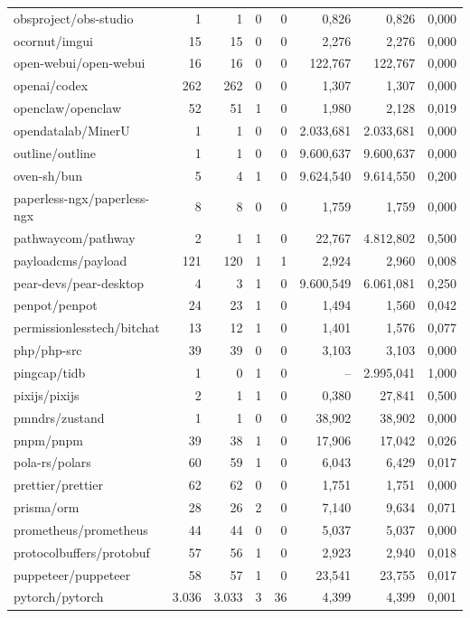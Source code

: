 \begin{tabular}{lrrrrrrr}
obsproject/obs-studio & 1 & 1 & 0 & 0 & 0,826 & 0,826 & 0,000 \\
ocornut/imgui & 15 & 15 & 0 & 0 & 2,276 & 2,276 & 0,000 \\
open-webui/open-webui & 16 & 16 & 0 & 0 & 122,767 & 122,767 & 0,000 \\
openai/codex & 262 & 262 & 0 & 0 & 1,307 & 1,307 & 0,000 \\
openclaw/openclaw & 52 & 51 & 1 & 0 & 1,980 & 2,128 & 0,019 \\
opendatalab/MinerU & 1 & 1 & 0 & 0 & 2.033,681 & 2.033,681 & 0,000 \\
outline/outline & 1 & 1 & 0 & 0 & 9.600,637 & 9.600,637 & 0,000 \\
oven-sh/bun & 5 & 4 & 1 & 0 & 9.624,540 & 9.614,550 & 0,200 \\
paperless-ngx/paperless-ngx & 8 & 8 & 0 & 0 & 1,759 & 1,759 & 0,000 \\
pathwaycom/pathway & 2 & 1 & 1 & 0 & 22,767 & 4.812,802 & 0,500 \\
payloadcms/payload & 121 & 120 & 1 & 1 & 2,924 & 2,960 & 0,008 \\
pear-devs/pear-desktop & 4 & 3 & 1 & 0 & 9.600,549 & 6.061,081 & 0,250 \\
penpot/penpot & 24 & 23 & 1 & 0 & 1,494 & 1,560 & 0,042 \\
permissionlesstech/bitchat & 13 & 12 & 1 & 0 & 1,401 & 1,576 & 0,077 \\
php/php-src & 39 & 39 & 0 & 0 & 3,103 & 3,103 & 0,000 \\
pingcap/tidb & 1 & 0 & 1 & 0 & -- & 2.995,041 & 1,000 \\
pixijs/pixijs & 2 & 1 & 1 & 0 & 0,380 & 27,841 & 0,500 \\
pmndrs/zustand & 1 & 1 & 0 & 0 & 38,902 & 38,902 & 0,000 \\
pnpm/pnpm & 39 & 38 & 1 & 0 & 17,906 & 17,042 & 0,026 \\
pola-rs/polars & 60 & 59 & 1 & 0 & 6,043 & 6,429 & 0,017 \\
prettier/prettier & 62 & 62 & 0 & 0 & 1,751 & 1,751 & 0,000 \\
prisma/orm & 28 & 26 & 2 & 0 & 7,140 & 9,634 & 0,071 \\
prometheus/prometheus & 44 & 44 & 0 & 0 & 5,037 & 5,037 & 0,000 \\
protocolbuffers/protobuf & 57 & 56 & 1 & 0 & 2,923 & 2,940 & 0,018 \\
puppeteer/puppeteer & 58 & 57 & 1 & 0 & 23,541 & 23,755 & 0,017 \\
pytorch/pytorch & 3.036 & 3.033 & 3 & 36 & 4,399 & 4,399 & 0,001 \\

\end{tabular}
